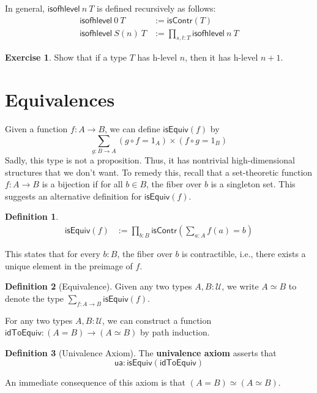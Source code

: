 \documentclass{amsart}
\theoremstyle{definition}
\newtheorem{ex}{Exercise}[section]
\newtheorem{defn}{Definition}[section]
\newcommand{\isContr}{\ensuremath{\mathsf{isContr}}}
\newcommand{\isofhlevel}[2]{\ensuremath{\mathsf{isofhlevel}~#1~#2}}
\newcommand{\isEquiv}{\ensuremath{\mathsf{isEquiv}}}
\newcommand{\idToEquiv}{\ensuremath{\mathsf{idToEquiv}}}
\newcommand{\U}{\ensuremath{\mathcal{U}}}
\newcommand{\ua}{\ensuremath{\mathsf{ua}}}
\renewcommand{\emph}{\textbf}
\begin{document}
In general, $\isofhlevel{n}{T}$ is defined recursively as follows:
\begin{align*}
    \isofhlevel{0}{T} &:= \isContr(T)\\
    \isofhlevel{S(n)}{T} &:= \prod_{s,t : T}\isofhlevel{n}{T}
\end{align*}

\begin{ex}
Show that if a type $T$ has h-level $n$, then it has h-level $n + 1$.
\end{ex}

\section{Equivalences}
Given a function $f : A \to B$, we can define $\isEquiv(f)$ by
\[
    \sum_{g : B \to A} (g \circ f = 1_{A}) \times (f \circ g = 1_{B})
\]
Sadly, this type is not a proposition.
Thus, it has nontrivial high-dimensional structures that we don't want.
To remedy this, recall that a set-theoretic function $f : A \to B$ is a bijection if for all $b \in B$, the fiber over $b$ is a singleton set.
This suggests an alternative definition for $\isEquiv(f)$.
\begin{defn}
\begin{align*}
    \isEquiv(f) &:= \prod_{b : B} \isContr\left(\sum_{a : A} f(a)=b\right)
\end{align*}
\end{defn}
This states that for every $b : B$, the fiber over $b$ is contractible, i.e., there exists a unique element in the preimage of $f$.

\begin{defn}[Equivalence]
    Given any two types $A, B : \U$, we write $A \simeq B$ to denote the type $\displaystyle\sum_{f : A \to B} \isEquiv(f)$.
\end{defn}
For any two types $A, B : \U$, we can construct a function $\idToEquiv : (A = B) \to (A \simeq B)$ by path induction.
\begin{defn}[Univalence Axiom]
    The \emph{univalence axiom} asserts that 
    \[\ua : \isEquiv(\idToEquiv)\]
\end{defn}
An immediate consequence of this axiom is that $(A = B) \simeq (A \simeq B)$.
\end{document}
